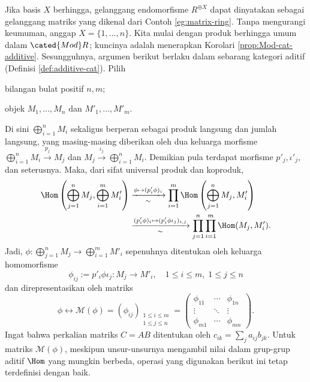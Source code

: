 Jika basis $X$ berhingga, gelanggang endomorfisme $R^{\oplus X}$ dapat dinyatakan sebagai gelanggang matriks yang dikenal dari Contoh \ref{eg:matrix-ring}. Tanpa mengurangi keumuman, anggap $X = \{1, \ldots, n\}$. Kita mulai dengan produk berhingga umum dalam $\cated{Mod}R$; kuncinya adalah menerapkan Korolari \ref{prop:Mod-cat-additive}. Sesungguhnya, argumen berikut berlaku dalam sebarang kategori aditif (Definisi \ref{def:additive-cat}). Pilih
\begin{compactitem}
	\item bilangan bulat positif $n, m$;
	\item objek $M_1, \ldots, M_n$ dan $M'_1, \ldots, M'_m$.
\end{compactitem}
Di sini $\bigoplus_{i=1}^n M_i$ sekaligus berperan sebagai produk langsung dan jumlah langsung, yang masing-masing diberikan oleh dua keluarga morfisme $\bigoplus_{i=1}^n M_i \xrightarrow{p_j} M_j$ dan $M_j \xrightarrow{\iota_j} \bigoplus_{i=1}^n M_i$. Demikian pula terdapat morfisme $p'_j, \iota'_j$, dan seterusnya. Maka, dari sifat universal produk dan koproduk,
\begin{align*}
	\Hom \left( \bigoplus_{j=1}^n M_j, \bigoplus_{i=1}^m M'_i \right) & \xrightarrow[\sim]{\phi \mapsto (p'_i \phi)_i } \prod_{i=1}^m \Hom\left(\bigoplus_{j=1}^n M_j , M'_i \right) \\
	& \xrightarrow[\sim]{(p'_i \phi)_i \mapsto (p'_i \phi \iota_j)_{i, j}} \prod_{j=1}^n \prod_{i=1}^m  \Hom(M_j, M'_i).
\end{align*}
Jadi, $\phi: \bigoplus_{j=1}^n M_j \to \bigoplus_{i=1}^m M'_i$ sepenuhnya ditentukan oleh keluarga homomorfisme
\[ \phi_{ij} := p'_i \phi \iota_j: M_j \to M'_i, \quad 1 \leq i \leq m, \; 1 \leq j \leq n \]
dan direpresentasikan oleh matriks
\[ \phi \longleftrightarrow \mathcal{M}(\phi) = (\phi_{ij})_{\substack{1 \leq i \leq m \\ 1 \leq j \leq n}} = \begin{pmatrix}
	\phi_{11} & \cdots & \phi_{1n} \\
	\vdots & \ddots & \vdots \\
	\phi_{m1} & \cdots & \phi_{mn} 
\end{pmatrix}. \]
Ingat bahwa perkalian matriks $C=AB$ ditentukan oleh $c_{ik} = \sum_j a_{ij} b_{jk}$. Untuk matriks $\mathcal{M}(\phi)$, meskipun unsur-unsurnya mengambil nilai dalam grup-grup aditif $\Hom$ yang mungkin berbeda, operasi yang digunakan berikut ini tetap terdefinisi dengan baik.

